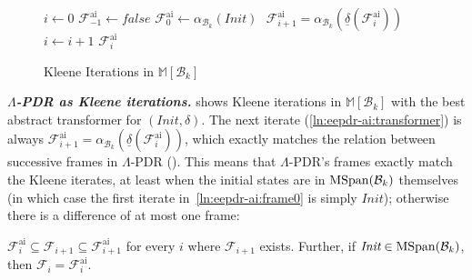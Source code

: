\documentclass[acmsmall,screen]{acmart}
\newcommand{\para}[1]{\vspace{2pt}\noindent\textbf{\textit{#1.}}}
\renewcommand{\implies}{\Longrightarrow}
\newcommand{\notimplies}{\centernot\implies}
\newcommand{\false}{{\textit{false}}}
\newcommand{\Init}{{\textit{Init}}}
\newcommand{\Bad}{\textit{Bad}}
\newcommand{\tr}{\delta}
\newcommand{\Frame}{\mathcal{F}}
\newcommand{\Frameai}{\mathcal{F}^{\text{ai}}}
\newcommand{\reflextr}[1]{\underline{#1}}
\newcommand{\postimage}[2]{{\reflextr{#1}}({#2})}
\newcommand{\bkwrch}[1]{\mathcal{B}_{#1}}
\newcommand{\mspan}[1]{{\rm MSpan}({#1})}
\newcommand{\bkwspan}[1]{\mspan{\bkwrch{#1}}}
\newcommand{\malpha}[1]{\alpha_{#1}}
\newcommand{\madom}[1]{\mathbb{M}[{#1}]}
\begin{document}
%
%
%
%
%
%
%
%
%
%
%
%
%
\begin{wrapfigure}{r}{0.33\textwidth}
\vspace{-0.8cm}
\begin{minipage}{0.33\textwidth}
\begin{algorithm}[H]
\caption{Kleene Iterations in $\madom{\bkwrch{k}}$}
\label{alg:eepdr-ai}
\begin{algorithmic}[1]
\begin{footnotesize}
\Procedure{$\Lambda$-PDR}{$\Init$, $\tr$, $\Bad$, $k$}
	\State $i \gets 0$
	\State $\Frameai_{-1} \gets \false$
	\State $\Frameai_0 \gets \malpha{\bkwrch{k}}(\Init)$ $\label{ln:eepdr-ai:frame0}$
	\While{$\Frameai_{i} \notimplies \Frameai_{i-1}$}
		\State $\Frameai_{i+1} = \malpha{\bkwrch{k}}(\postimage{\tr}{\Frameai_i})$ $\label{ln:eepdr-ai:transformer}$
		\State $i \gets i+1$
	\EndWhile
	\State \Return $\Frameai_i$
\EndProcedure
\end{footnotesize}
\end{algorithmic}
\end{algorithm}
\end{minipage}
\vspace{-0.6cm}
\end{wrapfigure} %
%
%
%
%
%
\para{$\Lambda$-PDR as Kleene iterations}
%
%
 shows Kleene iterations in $\madom{\bkwrch{k}}$ with the best abstract transformer for $(\Init,\tr)$.
The next iterate (\cref{ln:eepdr-ai:transformer}) is always $\Frameai_{i+1}=\malpha{\bkwrch{k}}(\postimage{\tr}{\Frameai_i})$, which exactly matches the relation between successive frames in $\Lambda$-PDR ().
%
%
%
%
%
%
%
%
%
%
%
%
%
%
%
%
%
%
%
%
%
%
%
%
%
%
%
%
%
%
%
%
%
%
%
%
%
%
%
%
%
%
%
%
%
%
%
%
%
%
%
%
%
%
This means that $\Lambda$-PDR's frames exactly match the Kleene iterates, at least when the initial states are in $\bkwspan{k}$ themselves (in which case the first iterate in~\cref{ln:eepdr-ai:frame0} is simply $\Init$); otherwise there is a difference of at most one frame:
%
\begin{theorem}
\label{lem:ai-eepdr-sandwich}
$\Frameai_i \subseteq \Frame_{i+1} \subseteq \Frameai_{i+1}$ for every $i$ where $\Frame_{i+1}$ exists.
%
Further, if $\Init \in \bkwspan{k}$, then $\Frame_{i}=\Frameai_i$.
\end{theorem}
\end{document}
